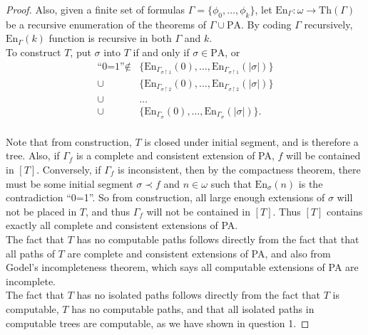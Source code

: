\documentclass{article}
\begin{document}
\begin{enumerate}[label={\bf Q\arabic*:}]
\begin{proof}
      Also, given a finite set of formulas $\Gamma=\{\phi_0,\ldots,\phi_k\}$,
      let $\text{En}_\Gamma:\omega\rightarrow\text{Th}(\Gamma)$ be a recursive
      enumeration of the theorems of $\Gamma\cup\text{PA}$. By coding
      $\Gamma$ recursively, $\text{En}_\Gamma(k)$ function is recursive in
      both $\Gamma$ and $k$. \\

      To construct $T$, put $\sigma$ into $T$ if and only if
      $\sigma\in\text{PA}$, or
      \begin{align*}
        \text{``0=1''}\notin &\{\text{En}_{\Gamma_{\sigma\restriction1}}(0),
          \ldots,\text{En}_{\Gamma_{\sigma\restriction1}}(|\sigma|)\}\\
        \cup &\{\text{En}_{\Gamma_{\sigma\restriction2}}(0),
          \ldots,\text{En}_{\Gamma_{\sigma\restriction2}}(|\sigma|)\}\\
        \cup &\ldots\\
        \cup &\{\text{En}_{\Gamma_\sigma}(0),
          \ldots,\text{En}_{\Gamma_\sigma}(|\sigma|)\}.\\
      \end{align*}

      Note that from construction, $T$ is closed under initial segment, and
      is therefore a tree. Also, if $\Gamma_f$ is a complete and consistent
      extension of PA, $f$ will be contained in $[T]$.  Conversely, if
      $\Gamma_f$ is inconsistent, then by the compactness theorem, there
      must be some initial segment $\sigma\prec f$ and $n\in\omega$ such
      that $\text{En}_\sigma(n)$ is the contradiction ``0=1''. So from
      construction, all large enough extensions of $\sigma$ will not be
      placed in $T$, and thus $\Gamma_f$ will not be contained in $[T]$.
      Thus $[T]$ contains exactly all complete and consistent extensions of
      PA. \\

      The fact that $T$ has no computable paths follows directly from the
      fact that that all paths of $T$ are complete and consistent
      extensions of PA, and also from Godel's incompleteness theorem, which
      says all computable extensions of PA are incomplete. \\

      The fact that $T$ has no isolated paths follows directly from the
      fact that $T$ is computable, $T$ has no computable paths, and that
      all isolated paths in computable trees are computable, as we have
      shown in question 1.
    \end{proof}


\end{enumerate}
\end{document}
